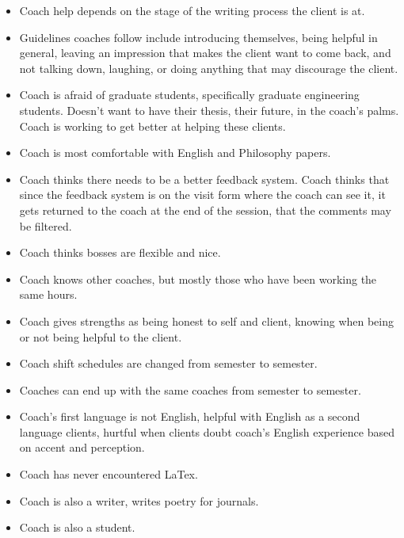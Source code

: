 \documentclass[12pt]{article} %
\begin{document}
\begin{itemize}
    \item Coach help depends on the stage of the writing process the client is at.
     
    \item Guidelines coaches follow include introducing themselves, being helpful in general, leaving an impression that makes the client want to come back, and not talking down, laughing, or doing anything that may discourage the client.
     
    \item Coach is afraid of graduate students, specifically graduate engineering students.  Doesn’t want to have their thesis, their future, in the coach’s palms.  Coach is working to get better at helping these clients.
     
    \item Coach is most comfortable with English and Philosophy papers. 
     
    \item Coach thinks there needs to be a better feedback system.  Coach thinks that since the feedback system is on the visit form where the coach can see it, it gets returned to the coach at the end of the session, that the comments may be filtered.
     
    \item Coach thinks bosses are flexible and nice.
     
    \item Coach knows other coaches, but mostly those who have been working the same hours.
     
    \item Coach gives strengths as being honest to self and client, knowing when being or not being helpful to the client.
     
    \item Coach shift schedules are changed from semester to semester.
     
    \item Coaches can end up with the same coaches from semester to semester.
     
    \item Coach’s first language is not English, helpful with English as a second language clients, hurtful when clients doubt coach’s English experience based on accent and perception. 
     
    \item Coach has never encountered LaTex.
     
    \item Coach is also a writer, writes poetry for journals.
     
    \item Coach is also a student.
  \end{itemize}
  
\end{document}
